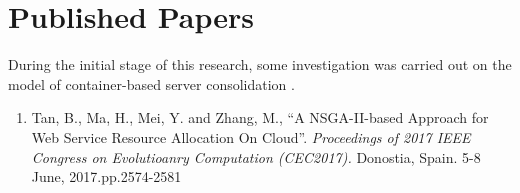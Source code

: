 \section{Published Papers}

During the initial stage of this research, some investigation 
was carried out on the model of container-based server consolidation \cite{Tan:2017fa}. 

\begin{enumerate}
	\item Tan, B., Ma, H., Mei, Y. and Zhang, M., ``A NSGA-II-based Approach for Web Service Resource Allocation On Cloud''. \textit{
	Proceedings of 2017 IEEE Congress on Evolutioanry Computation (CEC2017). } Donostia, Spain. 5-8 June, 2017.pp.2574-2581 



\end{enumerate}

